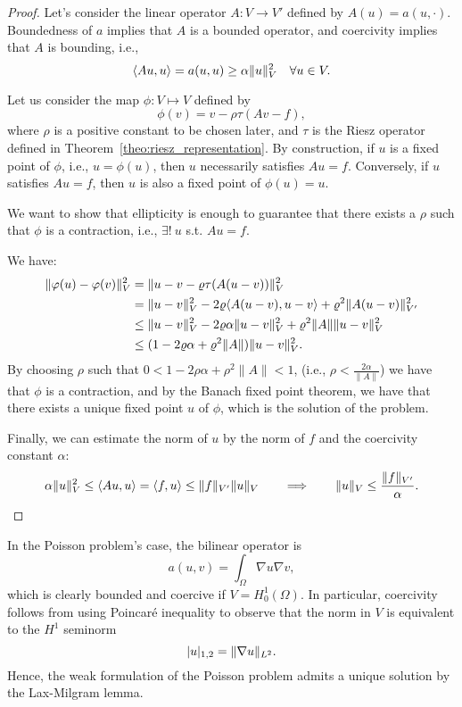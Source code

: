 \begin{proof}
  Let's consider the linear operator $A: V \to V'$ defined by $A(u) = a(u,\cdot)$.
  Boundedness of $a$ implies that $A$ is a bounded operator, and coercivity implies that $A$ is bounding, i.e., 
  \[
    \langle A u, u \rangle = a(u,u) \ge \alpha \lVert u\rVert_V^2 \quad \forall u \in V.
  \]
  
  Let us consider the map $\phi: V \mapsto V$ defined by 
  \[ 
    \phi(v) = v - \rho \tau(A v - f),
  \]
  where $\rho$ is a positive constant to be chosen later, and $\tau$ is the Riesz operator defined in Theorem~\ref{theo:riesz_representation}. By construction, if $u$ is a fixed point of $\phi$, i.e., $u= \phi(u)$, then $u$ necessarily satisfies $A u = f$. Conversely, if $u$ satisfies $Au=f$, then $u$ is also a fixed point of $\phi(u)=u$. 
  
  We want to show that ellipticity is enough to guarantee that there exists a $\rho$ such that $\phi$ is a contraction, i.e., $\exists! ~u$ s.t. $Au=f$.
  
  We have:
  \begin{align*}
    \lVert\varphi(u) - \varphi(v)\rVert_V^2 & = \lVert u - v - \varrho \tau(A(u - v))\rVert_V^2 \\
    & = \lVert u - v\rVert_V^2 - 2 \varrho \langle A(u - v), u - v \rangle + \varrho^2 \lVert A(u - v)\rVert_{V'}^2 \\
    & \leq \lVert u - v\rVert_V^2 - 2 \varrho \alpha \lVert u - v\rVert^2_V + \varrho^2 \|A\| \lVert u - v\rVert_V^2 \\
    & \leq  (1 - 2\varrho \alpha + \varrho^2 \|A\|) \lVert u - v\rVert_V^2.
  \end{align*}
  By choosing $\rho$ such that $0<1 - 2\rho \alpha + \rho^2 \|A\| < 1$, (i.e., $\rho<\frac{2\alpha}{\|A\|}$) we have that $\phi$ is a contraction, and by the Banach fixed point theorem, we have that there exists a unique fixed point $u$ of $\phi$, which is the solution of the problem.
  
  Finally, we can estimate the norm of $u$ by the norm of $f$ and the coercivity constant $\alpha$:
  \[
  \alpha \lVert u\rVert_V^2 \leq \langle A u, u \rangle = \langle f, u \rangle \leq \lVert f\rVert_{V'} \lVert u\rVert_V \qquad \Longrightarrow \qquad \lVert u\rVert_V \leq \frac{\lVert f\rVert_{V'}}{\alpha}.
  \]
\end{proof}

In the Poisson problem's case, the bilinear operator is
\[
a(u,v) = \int_\Omega \nabla u \nabla v,
\]
which is clearly bounded and coercive if $V=H_0^1(\Omega)$. In particular, coercivity follows from using Poincaré inequality to observe that the norm in $V$ is equivalent to the $H^1$ seminorm
\[
\lvert u\rvert_{1,2} = \lVert\nabla u\rVert_{L^2}.
\]
Hence, the weak formulation of the Poisson problem admits a unique solution by the Lax-Milgram lemma.

